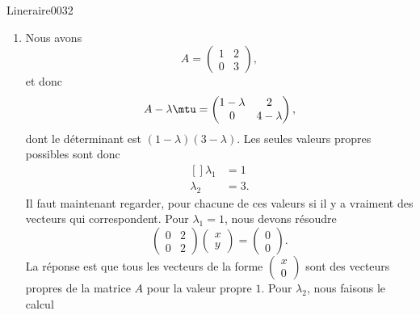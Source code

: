 \begin{corrige}{Lineraire0032}

	\begin{enumerate}

		\item
	Nous avons
	\begin{equation}
		A=\begin{pmatrix}
			1	&	2	\\ 
			0	&	3	
		\end{pmatrix},
	\end{equation}
	et donc
	\begin{equation}
		A-\lambda\mtu=\begin{pmatrix}
			1-\lambda	&	2	\\ 
			0	&	4-\lambda	
		\end{pmatrix},
	\end{equation}
	dont le déterminant est $(1-\lambda)(3-\lambda)$. Les seules valeurs propres possibles sont donc
	\begin{equation}
		\begin{aligned}[]
			\lambda_1&=1\\
			\lambda_2&=3.
		\end{aligned}
	\end{equation}
	Il faut maintenant regarder, pour chacune de ces valeurs si il y a vraiment des vecteurs qui correspondent. Pour $\lambda_1=1$, nous devons résoudre
	\begin{equation}
		\begin{pmatrix}
			0	&	2	\\ 
			0	&	2	
		\end{pmatrix}\begin{pmatrix}
			x	\\ 
			y	
		\end{pmatrix}=\begin{pmatrix}
			0	\\ 
			0	
		\end{pmatrix}.
	\end{equation}
	La réponse est que tous les vecteurs de la forme $\begin{pmatrix}
		x	\\ 
		0	
	\end{pmatrix}$ sont des vecteurs propres de la matrice $A$ pour la valeur propre $1$. Pour $\lambda_2$, nous faisons le calcul
	\begin{equation}

\end{equation}
\end{enumerate}
\end{corrige}

